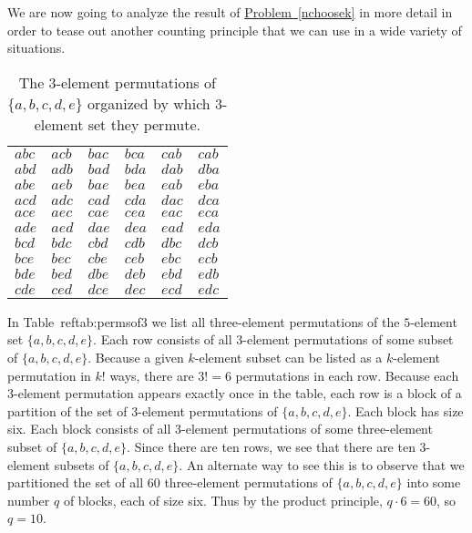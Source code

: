 \documentclass[10pt,]{book}
\theoremstyle{plain}
\theoremstyle{definition}
\numberwithin{equation}{chapter}
\begin{document}
We are now going to analyze the result of \hyperref[nchoosek]{Problem~\ref{nchoosek}} in more detail in order to tease out another counting principle that we can use in a wide variety of situations.%
\begin{table}
\centering
\begin{tabular}{llllll}
\(abc\)&\(acb\)&\(bac\)&\(bca\)&\(cab\)&\(cab\)\tabularnewline[0pt]
\(abd\)&\(adb\)&\(bad\)&\(bda\)&\(dab\)&\(dba\)\tabularnewline[0pt]
\(abe\)&\(aeb\)&\(bae\)&\(bea\)&\(eab\)&\(eba\)\tabularnewline[0pt]
\(acd\)&\(adc\)&\(cad\)&\(cda\)&\(dac\)&\(dca\)\tabularnewline[0pt]
\(ace\)&\(aec\)&\(cae\)&\(cea\)&\(eac\)&\(eca\)\tabularnewline[0pt]
\(ade\)&\(aed\)&\(dae\)&\(dea\)&\(ead\)&\(eda\)\tabularnewline[0pt]
\(bcd\)&\(bdc\)&\(cbd\)&\(cdb\)&\(dbc\)&\(dcb\)\tabularnewline[0pt]
\(bce\)&\(bec\)&\(cbe\)&\(ceb\)&\(ebc\)&\(ecb\)\tabularnewline[0pt]
\(bde\)&\(bed\)&\(dbe\)&\(deb\)&\(ebd\)&\(edb\)\tabularnewline[0pt]
\(cde\)&\(ced\)&\(dce\)&\(dec\)&\(ecd\)&\(edc\)
\end{tabular}
\caption{The \(3\)-element permutations of \(\{a,b,c,d,e\}\) organized by which \(3\)-element set they permute.\label{tab_permsof3}}
\end{table}
In Table~ref{tab:permsof3} we list all three-element permutations of the \(5\)-element set \(\{a,b,c,d,e\}\). Each row consists of all \(3\)-element permutations of some subset of \(\{a,b,c,d,e\}\). Because a given \(k\)-element subset can be listed as a \(k\)-element permutation in \(k!\) ways, there are \(3!=6\) permutations in each row. Because each \(3\)-element permutation appears exactly once in the table, each row is a block of a partition of the set of \(3\)-element permutations of \(\{a,b,c,d,e\}\). Each block has size six. Each block consists of all \(3\)-element permutations of some three-element subset of \(\{a,b,c,d,e\}\). Since there are ten rows, we see that there are ten \(3\)-element subsets of \(\{a,b,c,d,e\}\). An alternate way to see this is to observe that we partitioned the set of all \(60\) three-element permutations of \(\{a,b,c,d,e\}\) into some number \(q\) of blocks, each of size six. Thus by the product principle, \(q\cdot 6=60\), so \(q=10\).%
\end{document}
